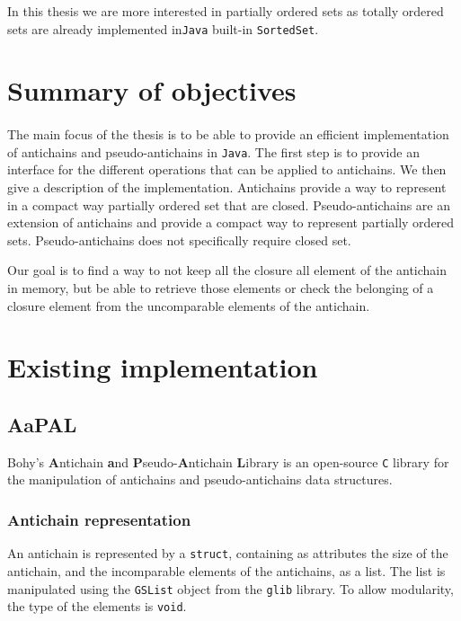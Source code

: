 \documentclass[letterpaper]{memoir}
\begin{document}
In this thesis we are more interested in partially ordered sets as
totally ordered sets are already implemented
in\texttt{Java} built-in
\texttt{SortedSet}.

\section{Summary of objectives}


\paragraph{}


The main focus of the thesis is to be able to provide an efficient
implementation of antichains and pseudo-antichains in \texttt{Java}.
The first step is to provide an interface for the different operations that
can be applied to antichains. We then give a description of the implementation.
Antichains provide a way to represent
in a compact way partially ordered set that are closed. Pseudo-antichains
are an extension of antichains and provide a compact way to represent
partially ordered sets. Pseudo-antichains does not specifically require
closed set.

Our goal is to find a way to not keep all the closure all
element of the antichain in memory, but be able to retrieve those elements
or check the belonging of a closure element from the uncomparable elements
of the antichain.

\section{Existing implementation}

\subsection{AaPAL}

Bohy's \textbf{A}ntichain
\textbf{a}nd \textbf{P}seudo-\textbf{A}ntichain \textbf{L}ibrary \cite{aapal}
is an open-source \texttt{C} library for the manipulation
of antichains and pseudo-antichains data structures.


\subsubsection{Antichain representation}

An antichain is represented by a \texttt{struct}, containing as attributes
the size of the antichain, and the incomparable elements of the antichains,
as a list. The list is manipulated using the \texttt{GSList} object
from the \texttt{glib} library. To allow modularity, the type of the elements
is \texttt{void}.
\end{document}
